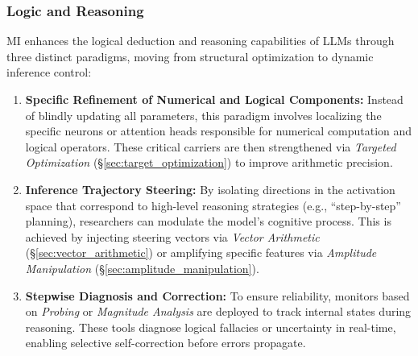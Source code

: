 \documentclass[11pt,letterpaper]{mystyle}
\begin{document}
  

\subsubsection{Logic and Reasoning}
\label{sec:logic_reasoning}

\begin{tcolorbox}[takeawaysbox, title={Summary of Application Paradigms}]
  MI enhances the logical deduction and reasoning capabilities of LLMs through three distinct paradigms, moving from structural optimization to dynamic inference control:
  \begin{enumerate}[leftmargin=*, label=\arabic*)]
  \item \textbf{Specific Refinement of Numerical and Logical Components:} Instead of blindly updating all parameters, this paradigm involves localizing the specific neurons or attention heads responsible for numerical computation and logical operators. These critical carriers are then strengthened via \textit{Targeted Optimization} (\S\ref{sec:target_optimization}) to improve arithmetic precision.
  \item \textbf{Inference Trajectory Steering:} By isolating directions in the activation space that correspond to high-level reasoning strategies (e.g., ``step-by-step'' planning), researchers can modulate the model's cognitive process. This is achieved by injecting steering vectors via \textit{Vector Arithmetic} (\S\ref{sec:vector_arithmetic}) or amplifying specific features via \textit{Amplitude Manipulation} (\S\ref{sec:amplitude_manipulation}).
  \item \textbf{Stepwise Diagnosis and Correction:} To ensure reliability, monitors based on \textit{Probing} or \textit{Magnitude Analysis} are deployed to track internal states during reasoning. These tools diagnose logical fallacies or uncertainty in real-time, enabling selective self-correction before errors propagate.
  \end{enumerate}
  \end{tcolorbox}
  
\end{document}
